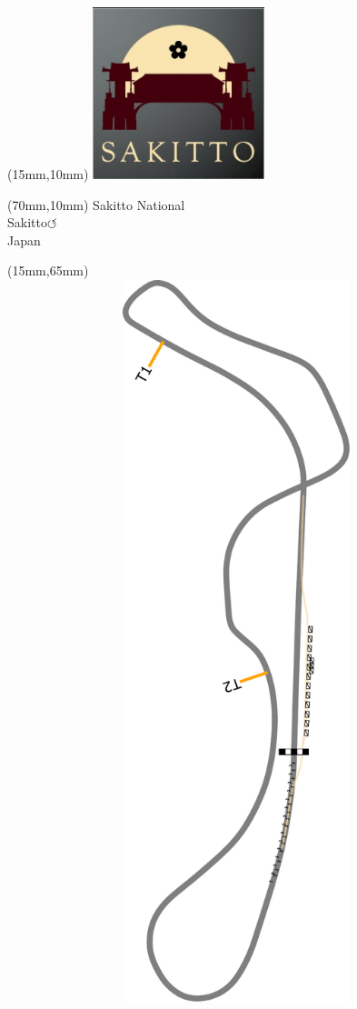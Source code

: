 \null\newpage
\begin{textblock*}{50mm}(15mm,10mm)%
\includegraphics[width=50mm]{LG/2015-05-20_00093.png}
\end{textblock*}
\begin{textblock*}{130mm}(70mm,10mm)%
{\fontsize{20}{20}\selectfont Sakitto National\\}
{\fontsize{16}{16}\selectfont Sakitto\hfill \huge$\circlearrowleft$\\}
{\fontsize{12}{12}\selectfont Japan\\}
\end{textblock*}
\begin{textblock*}{185mm}(15mm,65mm)%
\centering
\mbox{\includegraphics[width=185mm,height=210mm,keepaspectratio]{PT/SANA.pdf}}
\end{textblock*}
